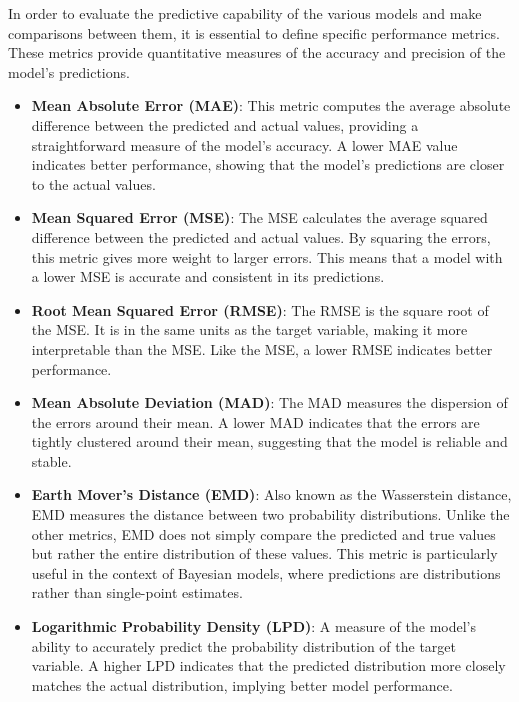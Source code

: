 In order to evaluate the predictive capability of the various models and make
comparisons between them, it is essential to define specific performance
metrics. These metrics provide quantitative measures of the accuracy and
precision of the model's predictions.

\begin{itemize}
\item \textbf{Mean Absolute Error (MAE)}: This metric computes the average absolute difference
between the predicted and actual values, providing a straightforward measure of
the model's accuracy. A lower MAE value indicates better performance, showing that the model's predictions are closer to the actual values.

\item \textbf{Mean Squared Error (MSE)}: The MSE calculates the average squared difference
between the predicted and actual values. By squaring the errors, this metric
gives more weight to larger errors. This means that a model with a lower MSE is
accurate and consistent in its predictions.

\item \textbf{Root Mean Squared Error (RMSE)}: The RMSE is the square root of the MSE. It is
in the same units as the target variable, making it more interpretable than the
MSE. Like the MSE, a lower RMSE indicates better performance.

\item \textbf{Mean Absolute Deviation (MAD)}: The MAD measures the dispersion of the errors
around their mean. A lower MAD indicates that the errors are tightly clustered
around their mean, suggesting that the model is reliable and stable.

\item \textbf{Earth Mover's Distance (EMD)}: Also known as the Wasserstein
  distance, EMD measures the distance between two probability
  distributions. Unlike the other metrics, EMD does not simply compare the
  predicted and true values but rather the entire distribution of these
  values. This metric is particularly useful in the context of Bayesian models,
  where predictions are distributions rather than single-point estimates. 

\item \textbf{Logarithmic Probability Density (LPD)}: A measure of the model's
ability to accurately predict the probability distribution of the target
variable. A higher LPD indicates that the predicted distribution more closely
matches the actual distribution, implying better model performance.
\end{itemize}


